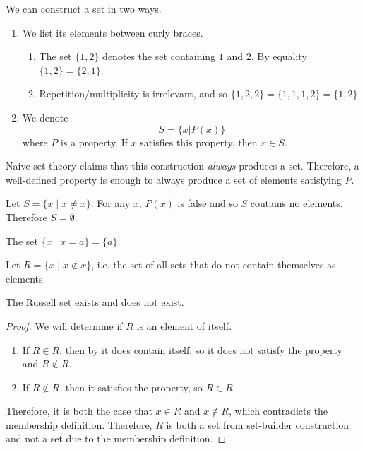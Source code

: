 \documentclass{article}
\begin{document}
    \begin{definition}
      We can construct a set in two ways. 
      \begin{enumerate}
        \item We list its elements between curly braces. 
        \begin{enumerate}
          \item The set $\{1, 2\}$ denotes the set containing $1$ and $2$. By equality $\{1, 2\} = \{2, 1\}$. 
          \item Repetition/multiplicity is irrelevant, and so $\{1, 2, 2\} = \{1, 1, 1, 2\} = \{1, 2\}$ 
        \end{enumerate} 

        \item We denote 
        \begin{equation}
          S = \{ x | P(x) \}
        \end{equation} 
        where $P$ is a property. If $x$ satisfies this property, then $x \in S$. 
      \end{enumerate}
      Naive set theory claims that this construction \textit{always} produces a set. Therefore, a well-defined property is enough to always produce a set of elements satisfying $P$. 
    \end{definition} 

    \begin{example}
      Let $S = \{x \mid x \neq x \}$. For any $x$, $P(x)$ is false and so $S$ contains no elements. Therefore $S = \emptyset$. 
    \end{example}

    \begin{example}
      The set $\{x \mid x = a \} = \{a\}$. 
    \end{example}

    \begin{example}
      Let $R = \{x \mid x \not\in x\}$, i.e. the set of all sets that do not contain themselves as elements. 
    \end{example}

    \begin{theorem} 
      The Russell set exists and does not exist. 
    \end{theorem}
    \begin{proof}
      We will determine if $R$ is an element of itself. 
      \begin{enumerate}
        \item If $R \in R$, then by it does contain itself, so it does not satisfy the property and $R \not\in R$. 
        \item If $R \not\in R$, then it satisfies the property, so $R \in R$. 
      \end{enumerate}
      Therefore, it is both the case that $x \in R$ and $x \not\in R$, which contradicts the membership definition. Therefore, $R$ is both a set from set-builder construction and not a set due to the membership definition. 
    \end{proof}
\end{document}
